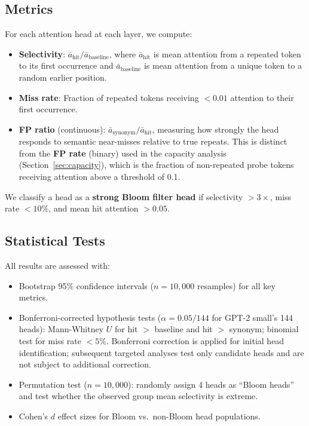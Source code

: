 \documentclass[11pt]{article}
\begin{document}
\subsection{Metrics}

For each attention head at each layer, we compute:
\begin{itemize}
    \item \textbf{Selectivity}: $\bar{a}_\text{hit} / \bar{a}_\text{baseline}$, where $\bar{a}_\text{hit}$ is mean attention from a repeated token to its first occurrence and $\bar{a}_\text{baseline}$ is mean attention from a unique token to a random earlier position.
    \item \textbf{Miss rate}: Fraction of repeated tokens receiving $< 0.01$ attention to their first occurrence.
    \item \textbf{FP ratio} (continuous): $\bar{a}_\text{synonym} / \bar{a}_\text{hit}$, measuring how strongly the head responds to semantic near-misses relative to true repeats. This is distinct from the \textbf{FP rate} (binary) used in the capacity analysis (Section~\ref{sec:capacity}), which is the fraction of non-repeated probe tokens receiving attention above a threshold of 0.1.
\end{itemize}

We classify a head as a \textbf{strong Bloom filter head} if selectivity $> 3\times$, miss rate $< 10\%$, and mean hit attention $> 0.05$.

\subsection{Statistical Tests}

All results are assessed with:
\begin{itemize}
    \item Bootstrap 95\% confidence intervals ($n = 10{,}000$ resamples) for all key metrics.
    \item Bonferroni-corrected hypothesis tests ($\alpha = 0.05/144$ for GPT-2 small's 144 heads): Mann-Whitney $U$ for hit $>$ baseline and hit $>$ synonym; binomial test for miss rate $< 5\%$. Bonferroni correction is applied for initial head identification; subsequent targeted analyses test only candidate heads and are not subject to additional correction.
    \item Permutation test ($n = 10{,}000$): randomly assign 4 heads as ``Bloom heads'' and test whether the observed group mean selectivity is extreme.
    \item Cohen's $d$ effect sizes for Bloom vs.\ non-Bloom head populations.
\end{itemize}
\end{document}
